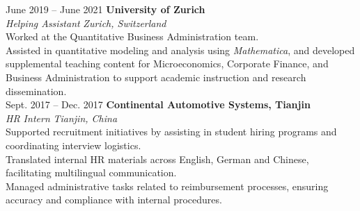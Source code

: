 \documentclass[a4paper,12pt]{article}
\begin{document}
June 2019 -- June 2021 \hfill \textbf{University of Zurich} \\
\textit{Helping Assistant} \hfill \textit{Zurich, Switzerland} \\
\textbullet Worked at the Quantitative Business Administration team. \\
\textbullet Assisted in quantitative modeling and analysis using \textit{Mathematica}, and developed supplemental teaching content for Microeconomics, Corporate Finance, and Business Administration to support academic instruction and research dissemination. \\


Sept. 2017 -- Dec. 2017 \hfill \textbf{Continental Automotive Systems, Tianjin} \\
\textit{HR Intern} \hfill \textit{Tianjin, China} \\
\textbullet Supported recruitment initiatives by assisting in student hiring programs and coordinating interview logistics. \\
\textbullet Translated internal HR materials across English, German and Chinese, facilitating multilingual communication. \\
\textbullet Managed administrative tasks related to reimbursement processes, ensuring accuracy and compliance with internal procedures. \\
\end{document}
